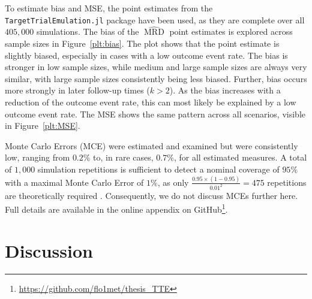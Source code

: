 \documentclass[pdflatex,sn-vancouver-ay]{sn-jnl}%
\theoremstyle{thmstyleone}%
\theoremstyle{thmstyletwo}%
\theoremstyle{thmstylethree}%
\newcommand{\juliaTTE}{\texttt{TargetTrialEmulation.jl}}
\begin{document}
To estimate bias and MSE, the point estimates from the \juliaTTE{} package have been used, as they are complete over all $405,000$ simulations. The bias of the $\widehat{\operatorname{MRD}}$ point estimates is explored across sample sizes in Figure~\ref{plt:bias}. The plot shows that the point estimate is slightly biased, especially in cases with a low outcome event rate. The bias is stronger in low sample sizes, while medium and large sample sizes are always very similar, with large sample sizes consistently being less biased. Further, bias occurs more strongly in later follow-up times ($k>2$). As the bias increases with a reduction of the outcome event rate, this can most likely be explained by a low outcome event rate. The MSE shows the same pattern across all scenarios, visible in Figure~\ref{plt:MSE}. 

Monte Carlo Errors (MCE) were estimated and examined but were consistently low, ranging from $0.2\%$ to, in rare cases, $0.7\%$, for all estimated measures. A total of $1,000$ simulation repetitions is sufficient to detect a nominal coverage of $95\%$ with a maximal Monte Carlo Error of $1\%$, as only $\frac{0.95 \times (1 - 0.95)}{0.01^2} = 475$ repetitions are theoretically required \citep{morrisUsingSimulationStudies2019a}. Consequently, we do not discuss MCEs further here. Full details are available in the online appendix on GitHub\footnote{\url{https://github.com/flo1met/thesis_TTE}}.


\section{Discussion}\label{sec:Discussion}
\end{document}
